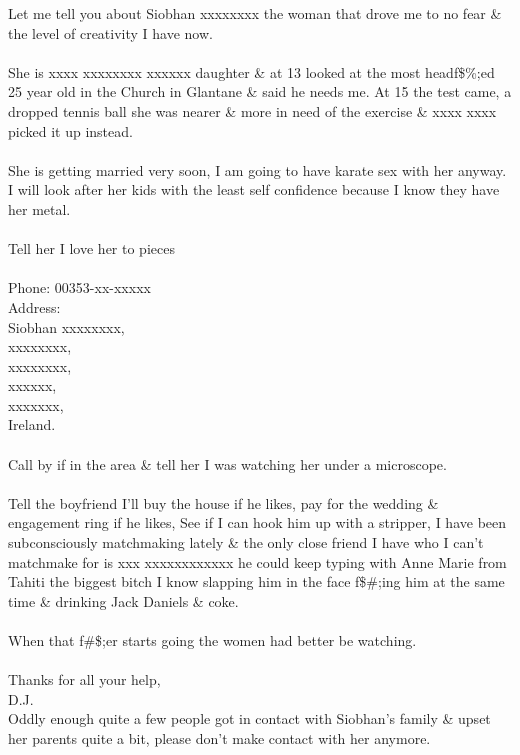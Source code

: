 \documentclass[a4paper,12pt,titlepage]{book}
\begin{document}
Let me tell you about Siobhan xxxxxxxx the woman that drove me to no 
fear \& the level of creativity I have now.\\\\
She is xxxx xxxxxxxx xxxxxx daughter \& at 13 looked at the most 
headf\$\%;ed 25 year old in the Church in Glantane \& said he needs me.
At 15 the test came, a dropped tennis ball she was nearer \& more in need 
of the exercise \& xxxx xxxx picked it up instead.\\\\
She is getting married very soon,
I am going to have karate sex with her anyway.
I will look after her kids with the least self confidence because I 
know they have her metal.\\\\
Tell her I love her to pieces\\\\
Phone: 00353-xx-xxxxx\\
Address:\\
Siobhan xxxxxxxx,\\
xxxxxxxx,\\
xxxxxxxx,\\
xxxxxx,\\
xxxxxxx,\\
Ireland.\\\\
Call by if in the area \& tell her I was watching her under a 
microscope.\\\\
Tell the boyfriend I'll buy the house if he likes,
pay for the wedding \& engagement ring if he likes,
See if I can hook him up with a stripper, I have been subconsciously
matchmaking lately \& the only close friend I have who I can't
matchmake for is xxx xxxxxxxxxxxx
he could keep typing with Anne Marie from Tahiti the
biggest bitch I know slapping him in the face f\$\#;ing him at the same
time \& drinking Jack Daniels \& coke.\\\\
When that f\#\$;er starts going the women had better be watching.\\\\
Thanks for all your help,\\
D.J.\\
Oddly enough quite a few people got in contact with
Siobhan's family \& upset her parents quite a bit,
please don't make contact with her anymore.
\end{document}

